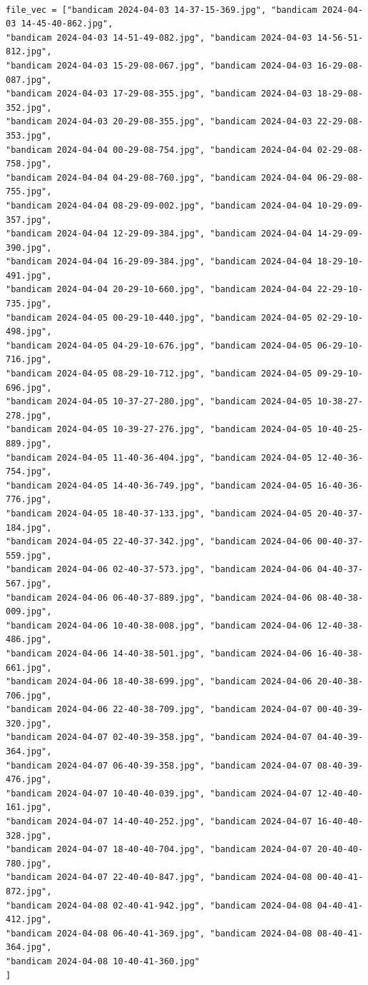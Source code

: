 \documentclass[11pt]{article}
\begin{document}
\begin{verbatim}

file_vec = ["bandicam 2024-04-03 14-37-15-369.jpg", "bandicam 2024-04-03 14-45-40-862.jpg",
"bandicam 2024-04-03 14-51-49-082.jpg", "bandicam 2024-04-03 14-56-51-812.jpg",
"bandicam 2024-04-03 15-29-08-067.jpg", "bandicam 2024-04-03 16-29-08-087.jpg",
"bandicam 2024-04-03 17-29-08-355.jpg", "bandicam 2024-04-03 18-29-08-352.jpg",
"bandicam 2024-04-03 20-29-08-355.jpg", "bandicam 2024-04-03 22-29-08-353.jpg",
"bandicam 2024-04-04 00-29-08-754.jpg", "bandicam 2024-04-04 02-29-08-758.jpg",
"bandicam 2024-04-04 04-29-08-760.jpg", "bandicam 2024-04-04 06-29-08-755.jpg",
"bandicam 2024-04-04 08-29-09-002.jpg", "bandicam 2024-04-04 10-29-09-357.jpg",
"bandicam 2024-04-04 12-29-09-384.jpg", "bandicam 2024-04-04 14-29-09-390.jpg",
"bandicam 2024-04-04 16-29-09-384.jpg", "bandicam 2024-04-04 18-29-10-491.jpg",
"bandicam 2024-04-04 20-29-10-660.jpg", "bandicam 2024-04-04 22-29-10-735.jpg",
"bandicam 2024-04-05 00-29-10-440.jpg", "bandicam 2024-04-05 02-29-10-498.jpg",
"bandicam 2024-04-05 04-29-10-676.jpg", "bandicam 2024-04-05 06-29-10-716.jpg",
"bandicam 2024-04-05 08-29-10-712.jpg", "bandicam 2024-04-05 09-29-10-696.jpg",
"bandicam 2024-04-05 10-37-27-280.jpg", "bandicam 2024-04-05 10-38-27-278.jpg",
"bandicam 2024-04-05 10-39-27-276.jpg", "bandicam 2024-04-05 10-40-25-889.jpg",
"bandicam 2024-04-05 11-40-36-404.jpg", "bandicam 2024-04-05 12-40-36-754.jpg",
"bandicam 2024-04-05 14-40-36-749.jpg", "bandicam 2024-04-05 16-40-36-776.jpg",
"bandicam 2024-04-05 18-40-37-133.jpg", "bandicam 2024-04-05 20-40-37-184.jpg",
"bandicam 2024-04-05 22-40-37-342.jpg", "bandicam 2024-04-06 00-40-37-559.jpg",
"bandicam 2024-04-06 02-40-37-573.jpg", "bandicam 2024-04-06 04-40-37-567.jpg",
"bandicam 2024-04-06 06-40-37-889.jpg", "bandicam 2024-04-06 08-40-38-009.jpg",
"bandicam 2024-04-06 10-40-38-008.jpg", "bandicam 2024-04-06 12-40-38-486.jpg",
"bandicam 2024-04-06 14-40-38-501.jpg", "bandicam 2024-04-06 16-40-38-661.jpg",
"bandicam 2024-04-06 18-40-38-699.jpg", "bandicam 2024-04-06 20-40-38-706.jpg",
"bandicam 2024-04-06 22-40-38-709.jpg", "bandicam 2024-04-07 00-40-39-320.jpg",
"bandicam 2024-04-07 02-40-39-358.jpg", "bandicam 2024-04-07 04-40-39-364.jpg",
"bandicam 2024-04-07 06-40-39-358.jpg", "bandicam 2024-04-07 08-40-39-476.jpg",
"bandicam 2024-04-07 10-40-40-039.jpg", "bandicam 2024-04-07 12-40-40-161.jpg",
"bandicam 2024-04-07 14-40-40-252.jpg", "bandicam 2024-04-07 16-40-40-328.jpg",
"bandicam 2024-04-07 18-40-40-704.jpg", "bandicam 2024-04-07 20-40-40-780.jpg",
"bandicam 2024-04-07 22-40-40-847.jpg", "bandicam 2024-04-08 00-40-41-872.jpg",
"bandicam 2024-04-08 02-40-41-942.jpg", "bandicam 2024-04-08 04-40-41-412.jpg",
"bandicam 2024-04-08 06-40-41-369.jpg", "bandicam 2024-04-08 08-40-41-364.jpg",
"bandicam 2024-04-08 10-40-41-360.jpg"
]
\end{verbatim}
\end{document}
